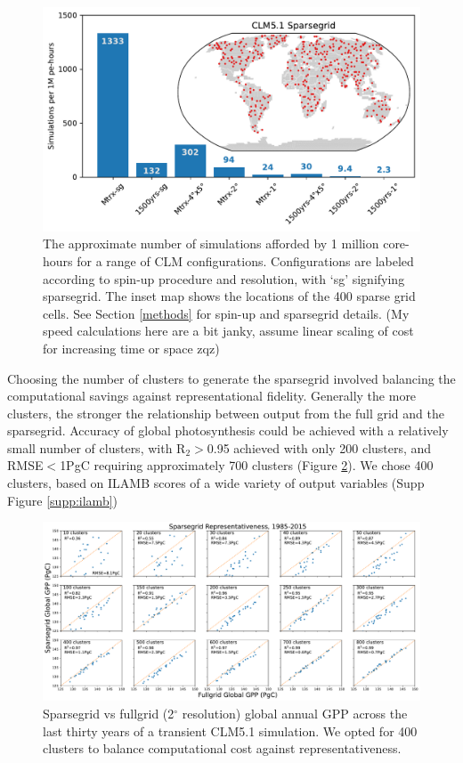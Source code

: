 \documentclass[draft]{agujournal2019}
\begin{document}
\begin{figure}[h]
\centering
\includegraphics[width=30pc]{../figs/sims.pdf}
\caption{The approximate number of simulations afforded by 1 million core-hours for a range of CLM configurations. Configurations are labeled according to spin-up procedure and resolution, with `sg' signifying sparsegrid. The inset map shows the locations of the 400 sparse grid cells. See Section \ref{methods} for spin-up and sparsegrid details. (My speed calculations here are a bit janky, assume linear scaling of cost for increasing time or space zqz) }
\label{fig:sims}
\end{figure}

Choosing the number of clusters to generate the sparsegrid involved balancing the computational savings against representational fidelity. Generally the more clusters, the 
stronger the relationship between output from the full grid and the sparsegrid. Accuracy of global photosynthesis could be achieved with a relatively small number of clusters, with R$_2>$0.95 achieved with only 200 clusters, and RMSE$<$1PgC requiring approximately 700 clusters (Figure \ref{fig:sggpp}). We chose 400 clusters, based on ILAMB scores of a wide variety of output variables (Supp Figure \ref{supp:ilamb})
\begin{figure}[h]
\centering
\includegraphics[width=40pc]{../figs/sparsegrid_gpp.pdf}
\caption{Sparsegrid vs fullgrid (2$^{\circ}$ resolution) global annual GPP across the last thirty years of a transient CLM5.1 simulation. We opted for 400 clusters to balance computational cost against representativeness.}
\label{fig:sggpp}
\end{figure}
\end{document}

